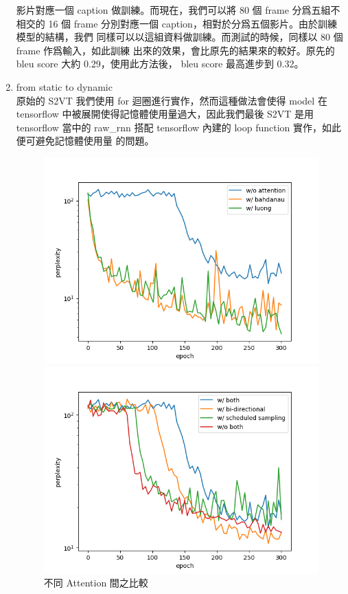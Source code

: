 \documentclass[12pt, a4paper]{article}
\theoremstyle{mystyle}	%
\begin{document}
\begin{enumerate}
  影片對應一個 caption 做訓練。而現在，我們可以將 80 個 frame 分爲五組不相交的
  16 個 frame 分別對應一個 caption，相對於分爲五個影片。由於訓練模型的結構，我們
  同樣可以以這組資料做訓練。而測試的時候，同樣以 80 個 frame 作爲輸入，如此訓練
  出來的效果，會比原先的結果來的較好。原先的 bleu score 大約 0.29，使用此方法後，
  bleu score 最高進步到 0.32。
\item from static to dynamic \\
  原始的 S2VT 我們使用 for 迴圈進行實作，然而這種做法會使得 model 在 tensorflow
  中被展開使得記憶體使用量過大，因此我們最後 S2VT 是用 tensorflow 當中的
  raw\_rnn 搭配 tensorflow 內建的 loop function 實作，如此便可避免記憶體使用量
  的問題。
  \begin{figure}[!htb]
    \centering
    \includegraphics[scale=0.5]{cmp_at_perplex.png}
    \caption{不同 Attention 間之比較}
    \label{fig:cmpat}
   \endminipage
   \hfill
    \includegraphics[scale=0.5]{at0.png}

\end{figure}
\end{enumerate}
\end{document}
